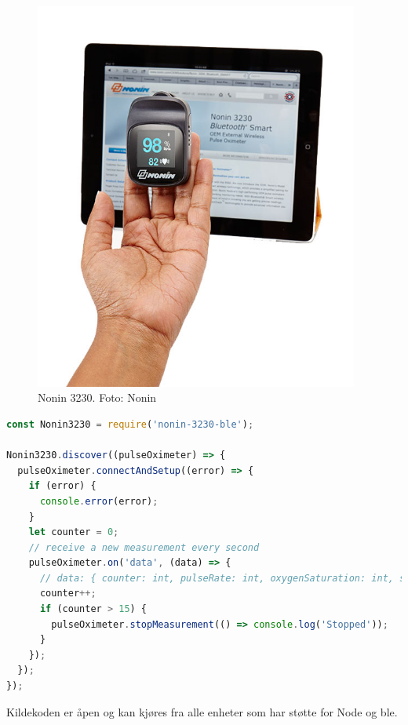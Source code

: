 \begin{figure}
\includegraphics[width=0.95\textwidth, center]{fig/Nonin3230iPad}
\caption{Nonin 3230. Foto: Nonin}
\label{fig:nonin-3230}
\end{figure}

\begin{minipage}{\linewidth}
\begin{lstlisting}[frame=single, language=JavaScript,
    caption=Bruk av nonin-3230-ble, label=lst:nonin-3230-usage]
const Nonin3230 = require('nonin-3230-ble');

Nonin3230.discover((pulseOximeter) => {
  pulseOximeter.connectAndSetup((error) => {
    if (error) {
      console.error(error);
    }
    let counter = 0;
    // receive a new measurement every second
    pulseOximeter.on('data', (data) => {
      // data: { counter: int, pulseRate: int, oxygenSaturation: int, status: object }
      counter++;
      if (counter > 15) {
        pulseOximeter.stopMeasurement(() => console.log('Stopped'));
      }
    });
  });
});
\end{lstlisting}
\end{minipage}

Kildekoden er åpen og kan kjøres fra alle enheter som har støtte for Node og \gls{ble}.


